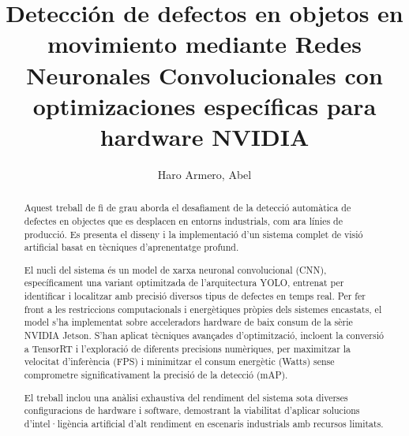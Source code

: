 \documentclass[11pt,spanish,listoffigures,listoftables]{tfgetsinf}
\title{Detección de defectos en objetos en movimiento mediante Redes Neuronales Convolucionales con optimizaciones específicas para hardware NVIDIA}
\author{Haro Armero, Abel}
\begin{document}

\begin{abstract}
Aquest treball de fi de grau aborda el desafiament de la detecció automàtica de defectes en objectes que es desplacen en entorns industrials, com ara línies de producció. Es presenta el disseny i la implementació d'un sistema complet de visió artificial basat en tècniques d'aprenentatge profund.

El nucli del sistema és un model de xarxa neuronal convolucional (CNN), específicament una variant optimitzada de l'arquitectura YOLO, entrenat per identificar i localitzar amb precisió diversos tipus de defectes en temps real. Per fer front a les restriccions computacionals i energètiques pròpies dels sistemes encastats, el model s'ha implementat sobre acceleradors hardware de baix consum de la sèrie NVIDIA Jetson. S'han aplicat tècniques avançades d'optimització, incloent la conversió a TensorRT i l'exploració de diferents precisions numèriques, per maximitzar la velocitat d'inferència (FPS) i minimitzar el consum energètic (Watts) sense comprometre significativament la precisió de la detecció (mAP). 

El treball inclou una anàlisi exhaustiva del rendiment del sistema sota diverses configuracions de hardware i software, demostrant la viabilitat d'aplicar solucions d'intel·ligència artificial d'alt rendiment en escenaris industrials amb recursos limitats.
\end{abstract}
\end{document}

